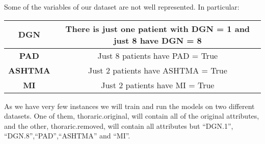 Some of the variables of our dataset are not well represented. In particular:

\begin{center}
\begin{tabular}{|c|c|}
  \hline
  \textbf{DGN} & There is just one patient with DGN = 1 and just 8 have DGN = 8 \\
  \hline
  \textbf{PAD} & Just 8 patients have PAD = True \\
  \hline
  \textbf{ASHTMA} & Just 2 patients have ASHTMA = True \\
  \hline
  \textbf{MI} & Just 2 patients have MI = True \\
  \hline
\end{tabular}
\end{center}

As we have very few instances we will train and run the models on two different datasets. One of them, thoraric.original, will contain all of the original attributes, and the other, thoraric.removed, will contain all attributes but  ``DGN.1'', ``DGN.8'',``PAD'',``ASHTMA'' and ``MI''.



%



